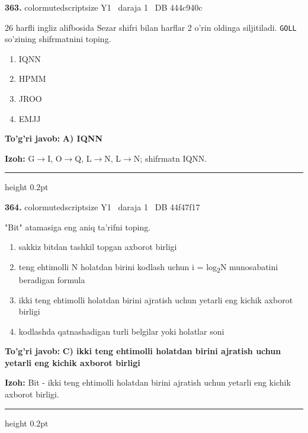\documentclass[10pt,a4paper,oneside]{article}
\begin{document}
\noindent\textbf{\color{ink}363.}  {color{muted}scriptsize Y1 \textbullet\ daraja 1 \textbullet\ DB 444c940c}
\par
26 harfli ingliz alifbosida Sezar shifri bilan harflar 2 o'rin oldinga siljitiladi. \texttt{GOLL} so'zining shifrmatnini toping.
\begin{enumerate}[label=\Alph*),leftmargin=9mm]
\item IQNN
\item HPMM
\item JROO
\item EMJJ
\end{enumerate}
\begin{tcolorbox}[enhanced,breakable,colback=teal!4,colframe=teal!50!black,boxrule=0.5pt,arc=1.1mm,left=3mm,right=3mm,top=1.7mm,bottom=1.7mm,before skip=2mm,after skip=2mm]
\textbf{\color{teal}To'g'ri javob:} \textbf{A) IQNN}
\par\smallskip
\textbf{Izoh:} G\ensuremath{\to}I, O\ensuremath{\to}Q, L\ensuremath{\to}N, L\ensuremath{\to}N; shifrmatn IQNN.
\end{tcolorbox}
\vspace{2mm}\hrule height 0.2pt \vspace{3mm}

\noindent\textbf{\color{ink}364.}  {color{muted}scriptsize Y1 \textbullet\ daraja 1 \textbullet\ DB 44f47f17}
\par
"Bit" atamasiga eng aniq ta'rifni toping.
\begin{enumerate}[label=\Alph*),leftmargin=9mm]
\item sakkiz bitdan tashkil topgan axborot birligi
\item teng ehtimolli N holatdan birini kodlash uchun i = log\textsubscript{2}N munosabatini beradigan formula
\item ikki teng ehtimolli holatdan birini ajratish uchun yetarli eng kichik axborot birligi
\item kodlashda qatnashadigan turli belgilar yoki holatlar soni
\end{enumerate}
\begin{tcolorbox}[enhanced,breakable,colback=teal!4,colframe=teal!50!black,boxrule=0.5pt,arc=1.1mm,left=3mm,right=3mm,top=1.7mm,bottom=1.7mm,before skip=2mm,after skip=2mm]
\textbf{\color{teal}To'g'ri javob:} \textbf{C) ikki teng ehtimolli holatdan birini ajratish uchun yetarli eng kichik axborot birligi}
\par\smallskip
\textbf{Izoh:} Bit - ikki teng ehtimolli holatdan birini ajratish uchun yetarli eng kichik axborot birligi.
\end{tcolorbox}
\vspace{2mm}\hrule height 0.2pt \vspace{3mm}
\end{document}
